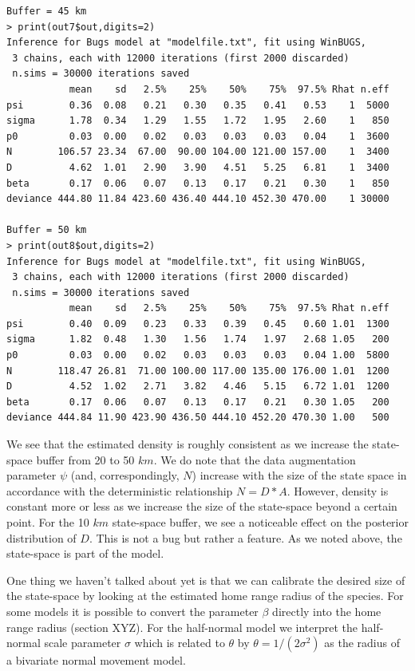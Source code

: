 \begin{verbatim}
Buffer = 45 km
> print(out7$out,digits=2)
Inference for Bugs model at "modelfile.txt", fit using WinBUGS,
 3 chains, each with 12000 iterations (first 2000 discarded)
 n.sims = 30000 iterations saved
           mean    sd   2.5%    25%    50%    75%  97.5% Rhat n.eff
psi        0.36  0.08   0.21   0.30   0.35   0.41   0.53    1  5000
sigma      1.78  0.34   1.29   1.55   1.72   1.95   2.60    1   850
p0         0.03  0.00   0.02   0.03   0.03   0.03   0.04    1  3600
N        106.57 23.34  67.00  90.00 104.00 121.00 157.00    1  3400
D          4.62  1.01   2.90   3.90   4.51   5.25   6.81    1  3400
beta       0.17  0.06   0.07   0.13   0.17   0.21   0.30    1   850
deviance 444.80 11.84 423.60 436.40 444.10 452.30 470.00    1 30000

Buffer = 50 km
> print(out8$out,digits=2)
Inference for Bugs model at "modelfile.txt", fit using WinBUGS,
 3 chains, each with 12000 iterations (first 2000 discarded)
 n.sims = 30000 iterations saved
           mean    sd   2.5%    25%    50%    75%  97.5% Rhat n.eff
psi        0.40  0.09   0.23   0.33   0.39   0.45   0.60 1.01  1300
sigma      1.82  0.48   1.30   1.56   1.74   1.97   2.68 1.05   200
p0         0.03  0.00   0.02   0.03   0.03   0.03   0.04 1.00  5800
N        118.47 26.81  71.00 100.00 117.00 135.00 176.00 1.01  1200
D          4.52  1.02   2.71   3.82   4.46   5.15   6.72 1.01  1200
beta       0.17  0.06   0.07   0.13   0.17   0.21   0.30 1.05   200
deviance 444.84 11.90 423.90 436.50 444.10 452.20 470.30 1.00   500
\end{verbatim}

We see that the estimated density is roughly consistent as we increase
the state-space buffer from 20 to 50 $km$. We do note that the data
augmentation parameter $\psi$ (and, correspondingly, $N$) increase with
the size of the state space in accordance with the deterministic
relationship $N= D*A$. However, density is constant more or less as we
increase the size of the state-space beyond a certain point.  For the
10 $km$ state-space buffer, we see a noticeable effect on the posterior
distribution of $D$. This is not a bug but rather a feature. As we noted
above, the state-space is part of the model.

One thing we haven't talked about yet is that we can calibrate the
desired size of the state-space by looking at the estimated home range
radius of the species. For some models it is possible to convert the
parameter $\beta$ directly into the home range radius (section
XYZ). For the half-normal model we interpret the half-normal scale
parameter $\sigma$ which is related to $\theta$ by $\theta = 
1/(2\sigma^2)$ as the radius of a bivariate normal movement model.

